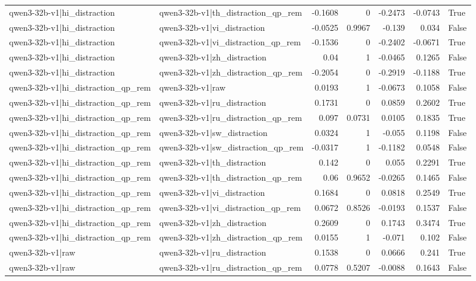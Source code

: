\begin{table}
\begin{tabular}{l l r r r r l}
qwen3-32b-v1|hi_distraction & qwen3-32b-v1|th_distraction_qp_rem & -0.1608 & 0 & -0.2473 & -0.0743 & True \\
qwen3-32b-v1|hi_distraction & qwen3-32b-v1|vi_distraction & -0.0525 & 0.9967 & -0.139 & 0.034 & False \\
qwen3-32b-v1|hi_distraction & qwen3-32b-v1|vi_distraction_qp_rem & -0.1536 & 0 & -0.2402 & -0.0671 & True \\
qwen3-32b-v1|hi_distraction & qwen3-32b-v1|zh_distraction & 0.04 & 1 & -0.0465 & 0.1265 & False \\
qwen3-32b-v1|hi_distraction & qwen3-32b-v1|zh_distraction_qp_rem & -0.2054 & 0 & -0.2919 & -0.1188 & True \\
qwen3-32b-v1|hi_distraction_qp_rem & qwen3-32b-v1|raw & 0.0193 & 1 & -0.0673 & 0.1058 & False \\
qwen3-32b-v1|hi_distraction_qp_rem & qwen3-32b-v1|ru_distraction & 0.1731 & 0 & 0.0859 & 0.2602 & True \\
qwen3-32b-v1|hi_distraction_qp_rem & qwen3-32b-v1|ru_distraction_qp_rem & 0.097 & 0.0731 & 0.0105 & 0.1835 & True \\
qwen3-32b-v1|hi_distraction_qp_rem & qwen3-32b-v1|sw_distraction & 0.0324 & 1 & -0.055 & 0.1198 & False \\
qwen3-32b-v1|hi_distraction_qp_rem & qwen3-32b-v1|sw_distraction_qp_rem & -0.0317 & 1 & -0.1182 & 0.0548 & False \\
qwen3-32b-v1|hi_distraction_qp_rem & qwen3-32b-v1|th_distraction & 0.142 & 0 & 0.055 & 0.2291 & True \\
qwen3-32b-v1|hi_distraction_qp_rem & qwen3-32b-v1|th_distraction_qp_rem & 0.06 & 0.9652 & -0.0265 & 0.1465 & False \\
qwen3-32b-v1|hi_distraction_qp_rem & qwen3-32b-v1|vi_distraction & 0.1684 & 0 & 0.0818 & 0.2549 & True \\
qwen3-32b-v1|hi_distraction_qp_rem & qwen3-32b-v1|vi_distraction_qp_rem & 0.0672 & 0.8526 & -0.0193 & 0.1537 & False \\
qwen3-32b-v1|hi_distraction_qp_rem & qwen3-32b-v1|zh_distraction & 0.2609 & 0 & 0.1743 & 0.3474 & True \\
qwen3-32b-v1|hi_distraction_qp_rem & qwen3-32b-v1|zh_distraction_qp_rem & 0.0155 & 1 & -0.071 & 0.102 & False \\
qwen3-32b-v1|raw & qwen3-32b-v1|ru_distraction & 0.1538 & 0 & 0.0666 & 0.241 & True \\
qwen3-32b-v1|raw & qwen3-32b-v1|ru_distraction_qp_rem & 0.0778 & 0.5207 & -0.0088 & 0.1643 & False \\

\end{tabular}
\end{table}
